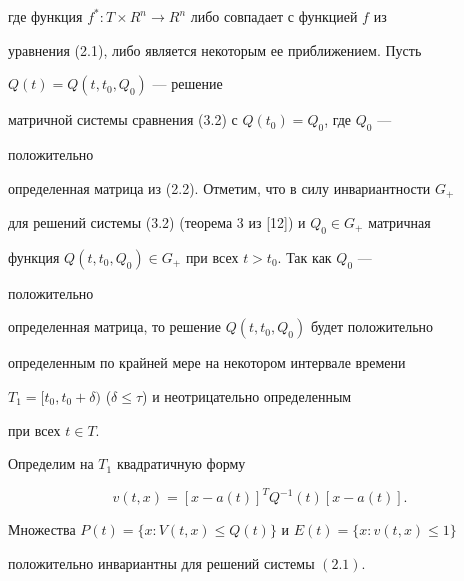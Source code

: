 где функция $f^*:T\times R^n\to R^n$ либо совпадает с функцией $f$ из 


уравнения (2.1), либо является некоторым ее приближением. Пусть 


$Q(t)=Q(t,t_0,Q_0)$ --- решение 


матричной системы сравнения (3.2) с $Q(t_0)=Q_0$, где $Q_0$ --- 


положительно 


определенная матрица из (2.2). Отметим, что в силу инвариантности $G_+$ 


для решений системы (3.2) (теорема 3 из [12]) и $Q_0\in G_+$ матричная 


функция $Q(t,t_0,Q_0)\in G_+$ при всех $t>t_0$. Так как $Q_0$ --- 


положительно 


определенная матрица, то решение $Q(t,t_0,Q_0)$ будет положительно 


определенным по крайней мере на некотором интервале времени 


$T_1=[t_0,t_0+\delta)$ ($\delta\le\tau$) и неотрицательно определенным 


при всех $t\in T$. 


Определим на $T_1$ квадратичную форму 


\begin{equation} 


v(t,x)=[x-a(t)]^T Q^{-1}(t)[x-a(t)]. 


\end{equation} 


 


\begin{lem} 


Множества $P(t)=\{x:V(t,x)\le Q(t)\}$ и $E(t)=\{x:v(t,x)\le1\}$ 


положительно инвариантны для решений системы $(2.1)$. 


\end{lem} 


 


